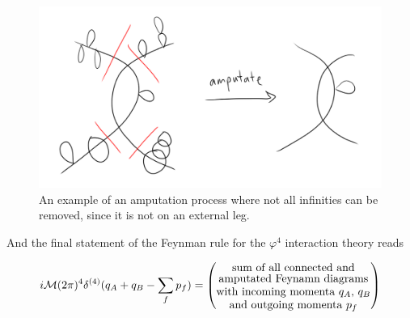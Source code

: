 \begin{figure}[H]
	\centering
	\includegraphics[scale=0.4]{images/amputation.png}
	\caption{An example of an amputation process where not all infinities can be removed, since it is not on an external leg.}
\end{figure}

\noindent And the final statement of the Feynman rule for the $\varphi^4$ interaction theory reads

\begin{equation}
i \mathcal{M} (2\pi)^4 \delta^{(4)} (q_A + q_B - \sum_f p_f) = \left( \stackanchor{\stackanchor{sum of all connected and}{amputated Feynamn diagrams}}{\stackanchor{with incoming momenta $q_A$, $q_B$}{and outgoing momenta $p_f$}} \right)
\end{equation}